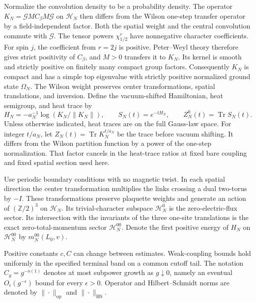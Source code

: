 \documentclass[11pt,a4paper]{article}
\numberwithin{equation}{section}
\newcommand{\HS}{\mathrm{HS}}
\newcommand{\Tr}{\operatorname{Tr}}
\newcommand{\op}{\mathrm{op}}
\begin{document}
Normalize the convolution density to be a probability density. The operator \(K_N=\mathcal G M C_\beta M\mathcal G\) on \(\mathcal H_N\) then differs from the Wilson one-step transfer operator by a field-independent factor. Both the spatial weight and the central convolution commute with \(\mathcal G\). The tensor powers \(\chi_{1/2}^r\) have nonnegative character coefficients. For spin \(j\), the coefficient from \(r=2j\) is positive. Peter--Weyl theory therefore gives strict positivity of \(C_\beta\), and \(M>0\) transfers it to \(K_N\). Its kernel is smooth and strictly positive on finitely many compact group factors. Consequently \(K_N\) is compact and has a simple top eigenvalue with strictly positive normalized ground state \(\Omega_N\). The Wilson weight preserves center transformations, spatial translations, and inversion. Define the vacuum-shifted Hamiltonian, heat semigroup, and heat trace by
\[
 H_N=-a_N^{-1}\log(K_N/\|K_N\|),\qquad
 S_N(t)=e^{-tH_N},\qquad Z_N^0(t)=\Tr S_N(t).
\]
Unless otherwise indicated, heat traces are on the full Gauss-law space. For integer \(t/a_N\), let \(Z_N(t)=\Tr K_N^{t/a_N}\) be the trace before vacuum shifting. It differs from the Wilson partition function by a power of the one-step normalization. That factor cancels in the heat-trace ratios at fixed bare coupling and fixed spatial section used here.

Use periodic boundary conditions with no magnetic twist. In each spatial direction the center transformation multiplies the links crossing a dual two-torus by \(-I\). These transformations preserve plaquette weights and generate an action of \((\mathbb Z/2)^3\) on \(\mathcal H_N\). Its trivial-character subspace \(\mathcal H_N^0\) is the zero-electric-flux sector. Its intersection with the invariants of the three one-site translations is the exact zero-total-momentum sector \(\mathcal H_N^{00}\). Denote the first positive energy of \(H_N\) on \(\mathcal H_N^{00}\) by \(m_N^{00}(L_0,v)\).

Positive constants \(c,C\) can change between estimates. Weak-coupling bounds hold uniformly in the specified terminal band on a common cutoff tail. The notation \(C_g=g^{-o(1)}\) denotes at most subpower growth as \(g\downarrow0\), namely an eventual \(O_\epsilon(g^{-\epsilon})\) bound for every \(\epsilon>0\). Operator and Hilbert--Schmidt norms are denoted by \(\|\cdot\|_{\op}\) and \(\|\cdot\|_{\HS}\).
\end{document}
